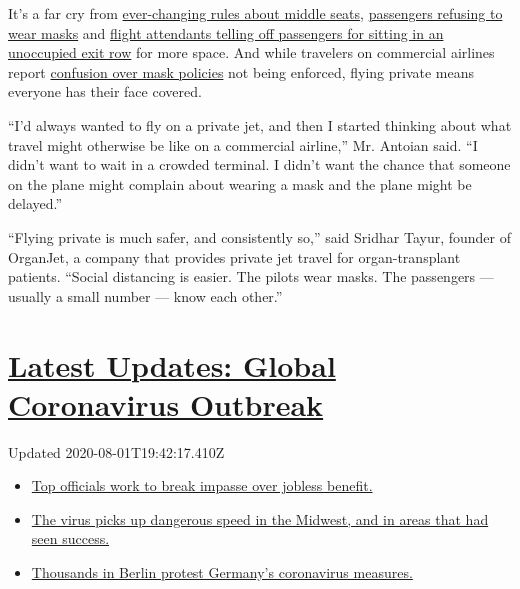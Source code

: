 It's a far cry from
\href{https://www.nytimes3xbfgragh.onion/2020/07/10/world/canada/canada-airlines-coronavirus.html}{ever-changing
rules about middle seats},
\href{https://www.nytimes3xbfgragh.onion/2020/06/18/us/american-airlines-mask-brandon-straka.html}{passengers
refusing to wear masks} and
\href{https://www.nytimes3xbfgragh.onion/2020/07/08/travel/airplanes-social-distancing-coronavirus.html}{flight
attendants telling off passengers for sitting in an unoccupied exit row}
for more space. And while travelers on commercial airlines report
\href{https://www.nytimes3xbfgragh.onion/2020/06/04/travel/coronavirus-flying-face-masks.html}{confusion
over mask policies} not being enforced, flying private means everyone
has their face covered.

``I'd always wanted to fly on a private jet, and then I started thinking
about what travel might otherwise be like on a commercial airline,'' Mr.
Antoian said. ``I didn't want to wait in a crowded terminal. I didn't
want the chance that someone on the plane might complain about wearing a
mask and the plane might be delayed.''

``Flying private is much safer, and consistently so,'' said Sridhar
Tayur, founder of OrganJet, a company that provides private jet travel
for organ-transplant patients. ``Social distancing is easier. The pilots
wear masks. The passengers --- usually a small number --- know each
other.''

\hypertarget{latest-updates-global-coronavirus-outbreak}{%
\section{\texorpdfstring{\href{https://www.nytimes3xbfgragh.onion/2020/08/01/world/coronavirus-covid-19.html?action=click\&pgtype=Article\&state=default\&region=MAIN_CONTENT_1\&context=storylines_live_updates}{Latest
Updates: Global Coronavirus
Outbreak}}{Latest Updates: Global Coronavirus Outbreak}}\label{latest-updates-global-coronavirus-outbreak}}

Updated 2020-08-01T19:42:17.410Z

\begin{itemize}
\tightlist
\item
  \href{https://www.nytimes3xbfgragh.onion/2020/08/01/world/coronavirus-covid-19.html?action=click\&pgtype=Article\&state=default\&region=MAIN_CONTENT_1\&context=storylines_live_updates\#link-3ac56579}{Top
  officials work to break impasse over jobless benefit.}
\item
  \href{https://www.nytimes3xbfgragh.onion/2020/08/01/world/coronavirus-covid-19.html?action=click\&pgtype=Article\&state=default\&region=MAIN_CONTENT_1\&context=storylines_live_updates\#link-8796723}{The
  virus picks up dangerous speed in the Midwest, and in areas that had
  seen success.}
\item
  \href{https://www.nytimes3xbfgragh.onion/2020/08/01/world/coronavirus-covid-19.html?action=click\&pgtype=Article\&state=default\&region=MAIN_CONTENT_1\&context=storylines_live_updates\#link-25930521}{Thousands
  in Berlin protest Germany's coronavirus measures.}
\end{itemize}

